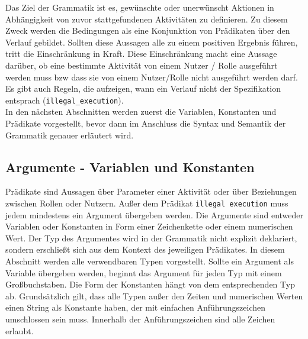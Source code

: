 Das Ziel der Grammatik ist es, gewünschte oder unerwünscht Aktionen in Abhängigkeit von zuvor stattgefundenen Aktivitäten zu definieren. Zu diesem Zweck werden die Bedingungen als eine Konjunktion von Prädikaten über den Verlauf gebildet. Sollten diese Aussagen alle zu einem positiven Ergebnis führen, tritt die Einschränkung in Kraft. Diese Einschränkung macht eine Aussage darüber, ob eine bestimmte Aktivität von einem Nutzer / Rolle ausgeführt werden muss bzw dass sie von einem Nutzer/Rolle nicht ausgeführt werden darf. Es gibt auch Regeln, die aufzeigen, wann ein Verlauf nicht der Spezifikation entsprach (\texttt{illegal\_execution}).\\
In den nächsten Abschnitten werden zuerst die Variablen, Konstanten und Prädikate vorgestellt, bevor dann im Anschluss die Syntax und Semantik der Grammatik genauer erläutert wird.

\subsection{Argumente - Variablen und Konstanten}

Prädikate sind Aussagen über Parameter einer Aktivität oder über Beziehungen zwischen Rollen oder Nutzern. Außer dem Prädikat \texttt{illegal execution} muss jedem mindestens ein Argument übergeben werden. Die Argumente sind entweder Variablen oder Konstanten in Form einer Zeichenkette oder einem numerischen Wert. Der Typ des Argumentes wird in der Grammatik nicht explizit deklariert, sondern erschließt sich aus dem Kontext des jeweiligen Prädikates. In diesem Abschnitt werden alle verwendbaren Typen vorgestellt. Sollte ein Argument als Variable übergeben werden, beginnt das Argument für jeden Typ mit einem Großbuchstaben. Die Form der Konstanten hängt von dem entsprechenden Typ ab. Grundsätzlich gilt, dass alle Typen außer den Zeiten und numerischen Werten einen String als Konstante haben, der mit einfachen Anführungszeichen umschlossen sein muss. Innerhalb der Anführungszeichen sind alle Zeichen erlaubt.

